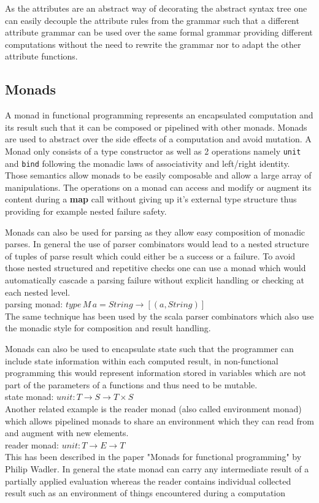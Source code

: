 As the attributes are an abstract way of decorating the abstract syntax tree one can easily decouple the attribute rules from the grammar such that a different attribute grammar can be used over the same formal grammar providing different computations without the need to rewrite the grammar nor to adapt the other attribute functions.

\subsection{Monads}
A monad in functional programming represents an encapsulated computation and its result such that it can be composed or pipelined with other monads. Monads are used to abstract over the side effects of a computation and avoid mutation. A Monad only consists of a type constructor as well as 2 operations namely \verb/unit/ and \verb/bind/ following the monadic laws of associativity and left/right identity. Those semantics allow monads to be easily composable and allow a large array of manipulations. The operations on a monad can access and modify or augment its content during a \textbf{map} call without giving up it's external type structure thus providing for example nested failure safety.
 
Monads can also be used for parsing as they allow easy composition of monadic parses. In general the use of parser combinators would lead to a nested structure of tuples of parse result which could either be a success or a failure. To avoid those nested structured and repetitive checks one can use a monad which would automatically cascade a parsing failure without explicit handling or checking at each nested level.\\
parsing monad: $type\, M\, a = String \rightarrow [(a, String)]$\\
The same technique has been used by the scala parser combinators which also use the monadic style for composition and result handling.

Monads can also be used to encapsulate state such that the programmer can include state information within each computed result, in non-functional programming this would represent information stored in variables which are not part of the parameters of a functions and thus need to be mutable.\\
state monad: $unit: T \rightarrow S \rightarrow T \times S $\\
Another related example is the reader monad (also called environment monad) which allows pipelined monads to share an environment which they can read from and augment with new elements.\\
reader monad: $unit: T \rightarrow E \rightarrow T $\\
This has been described in the paper "Monads for functional programming"\cite{monads} by Philip Wadler. In general the state monad can carry any intermediate result of a partially applied evaluation whereas the reader contains individual collected result such as an environment of things encountered during a computation

